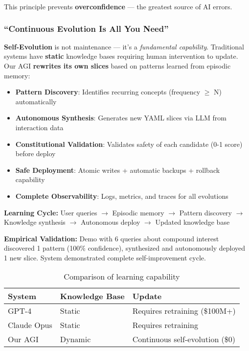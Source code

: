 \documentclass[11pt]{article}
\begin{document}
This principle prevents \textbf{overconfidence} --- the greatest source of AI errors.

\subsubsection{``Continuous Evolution Is All You Need''}

\textbf{Self-Evolution} is not maintenance --- it's a \textit{fundamental capability}. Traditional systems have \textbf{static} knowledge bases requiring human intervention to update. Our AGI \textbf{rewrites its own slices} based on patterns learned from episodic memory:

\begin{itemize}
    \item \textbf{Pattern Discovery}: Identifies recurring concepts (frequency $\geq$ N) automatically
    \item \textbf{Autonomous Synthesis}: Generates new YAML slices via LLM from interaction data
    \item \textbf{Constitutional Validation}: Validates safety of each candidate (0-1 score) before deploy
    \item \textbf{Safe Deployment}: Atomic writes + automatic backups + rollback capability
    \item \textbf{Complete Observability}: Logs, metrics, and traces for all evolutions
\end{itemize}

\textbf{Learning Cycle:} User queries $\rightarrow$ Episodic memory $\rightarrow$ Pattern discovery $\rightarrow$ Knowledge synthesis $\rightarrow$ Autonomous deploy $\rightarrow$ Updated knowledge base

\textbf{Empirical Validation:} Demo with 6 queries about compound interest discovered 1 pattern (100\% confidence), synthesized and autonomously deployed 1 new slice. System demonstrated complete self-improvement cycle.

\begin{table}[H]
\centering
\begin{tabular}{@{}lll@{}}
\toprule
\textbf{System} & \textbf{Knowledge Base} & \textbf{Update} \\ \midrule
GPT-4 & Static & Requires retraining (\$100M+) \\
Claude Opus & Static & Requires retraining \\
Our AGI & Dynamic & Continuous self-evolution (\$0) \\ \bottomrule
\end{tabular}
\caption{Comparison of learning capability}
\end{table}
\end{document}
